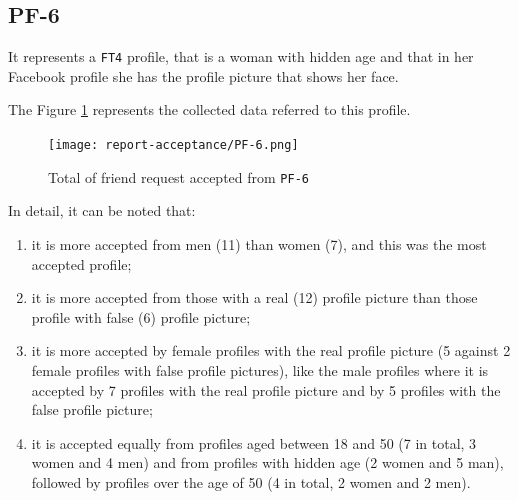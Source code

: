 \subsection*{PF-6}
It represents a \texttt{FT4} profile, that is a woman with hidden age and that in her Facebook profile she has the profile picture that shows her face.
\par \noindent The Figure \ref{fig:accepted-from-PF6} represents the collected data referred to this profile.
\begin{figure}[H]	
	\centering
	\texttt{[image: report-acceptance/PF-6.png]} 
	\caption{Total of friend request accepted from \texttt{PF-6}}
	\label{fig:accepted-from-PF6}
\end{figure}
\par \noindent In detail, it can be noted that:
\begin{enumerate}
	\item it is more accepted from men (11) than women (7), and this was the most accepted profile;
	\item it is more accepted from those with a real (12) profile picture than those profile with false (6) profile picture;
	\item it is more accepted by female profiles with the real profile picture (5 against 2 female profiles with false profile pictures), like the male profiles where it is accepted by 7 profiles with the real profile picture and by 5 profiles with the false profile picture;
	\item it is accepted equally from profiles aged between 18 and 50 (7 in total, 3 women and 4 men) and from profiles with hidden age (2 women and 5 man), followed by profiles over the age of 50 (4 in total, 2 women and 2 men).
\end{enumerate}


